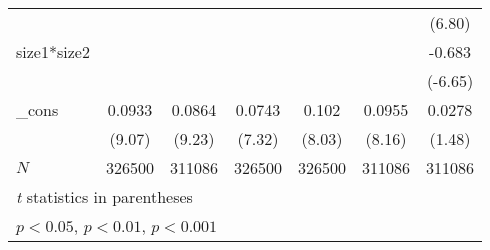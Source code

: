 {\begin{tabular}{l*{6}{c}}
            &                     &                     &                     &                     &                     &      (6.80)         \\
[1em]
size1*size2&                     &                     &                     &                     &                     &      -0.683\sym{***}\\
            &                     &                     &                     &                     &                     &     (-6.65)         \\
[1em]
\_cons      &      0.0933\sym{***}&      0.0864\sym{***}&      0.0743\sym{***}&       0.102\sym{***}&      0.0955\sym{***}&      0.0278         \\
            &      (9.07)         &      (9.23)         &      (7.32)         &      (8.03)         &      (8.16)         &      (1.48)         \\
\hline
\(N\)       &      326500         &      311086         &      326500         &      326500         &      311086         &      311086         \\
\hline\hline
\multicolumn{7}{l}{\footnotesize \textit{t} statistics in parentheses}\\
\multicolumn{7}{l}{\footnotesize \sym{*} \(p<0.05\), \sym{**} \(p<0.01\), \sym{***} \(p<0.001\)}\\
\end{tabular}
}
